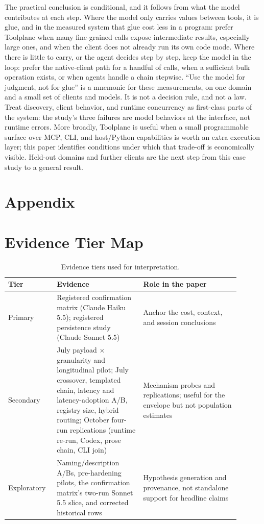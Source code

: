 \documentclass[10pt,twocolumn]{article}
\begin{document}
The practical conclusion is conditional, and it follows from what the model
contributes at each step.  Where the model only carries values between tools,
it is glue, and in the measured system that glue cost less in a program:
prefer Toolplane when many fine-grained calls expose intermediate results,
especially large ones, and when the client does not already run its own code
mode.  Where there is little to carry, or the agent decides step by step,
keep the model in the loop: prefer the native-client path for a handful of
calls, when a sufficient bulk operation exists, or when agents handle a chain
stepwise.  ``Use the model for judgment, not for glue'' is a mnemonic for
these measurements, on one domain and a small set of clients and models.  It
is not a decision rule, and not a law.  Treat discovery, client behavior, and runtime
concurrency as first-class parts of the system: the study's three failures are
model behaviors at the interface, not runtime errors.  More broadly, Toolplane
is useful when a small programmable surface over MCP, CLI, and host/Python
capabilities is worth an extra execution layer; this paper identifies
conditions under which that trade-off is economically visible.  Held-out
domains and further clients are the next step from this case study to a
general result.




\onecolumn
\appendix
\section*{Appendix}
\section{Evidence Tier Map}
\label{app:evidence-tiers}

\begin{table}[H]
\centering
\small
\caption{Evidence tiers used for interpretation.}
\label{tab:evidence-tiers}
\begin{tabular}{p{0.18\linewidth}p{0.34\linewidth}p{0.38\linewidth}}
\toprule
Tier & Evidence & Role in the paper \\
\midrule
Primary & Registered confirmation matrix (Claude Haiku 5.5); registered
persistence study (Claude Sonnet 5.5) & Anchor the cost, context, and session
conclusions \\
Secondary & July payload $\times$ granularity and longitudinal pilot; July
crossover, templated chain, latency and latency-adoption A/B, registry size,
hybrid routing; October four-run replications (runtime re-run, Codex, prose
chain, CLI join) &
Mechanism probes and replications; useful for the envelope but not population
estimates \\
Exploratory & Naming/description A/Bs, pre-hardening pilots, the confirmation
matrix's two-run Sonnet 5.5 slice, and corrected historical rows & Hypothesis generation and provenance, not standalone support
for headline claims \\
\bottomrule
\end{tabular}
\end{table}
\end{document}
